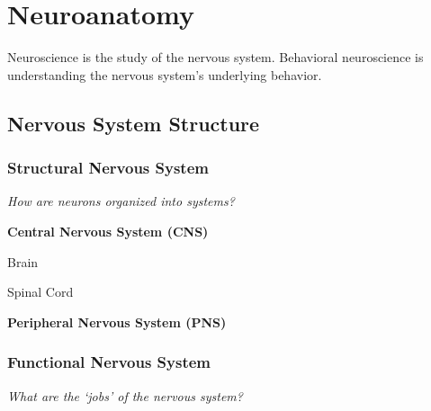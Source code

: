 \section{Neuroanatomy}

Neuroscience is the study of the nervous system. Behavioral neuroscience is understanding the nervous system's underlying behavior.

\subsection{Nervous System Structure}

\subsubsection{Structural Nervous System}

\textit{How are neurons organized into systems?}

\begin{coloredlist}
    \item \textbf{Central Nervous System (CNS)}
    \begin{coloredlist}
        \item Brain
        \item Spinal Cord
    \end{coloredlist}
    \item \textbf{Peripheral Nervous System (PNS)}

\end{coloredlist}

\subsubsection{Functional Nervous System}

\textit{What are the `jobs' of the nervous system?}

